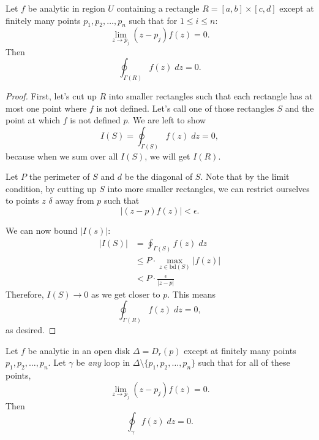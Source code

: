 \documentclass[notes]{subfile}
\begin{document}
\begin{theorem} 
    Let $f$ be analytic in region $U$ containing a rectangle
    $R = [a,b] \times [c,d]$ except at finitely many points
    $p_1, p_2, \ldots, p_n$ such that for $1 \le i \le n$:
    \[ \lim_{z \to p_j} (z-p_j) f(z) = 0.\]
    Then
    \[ \oint_{\Gamma(R)} f(z) \; dz = 0. \]
\end{theorem}

\begin{proof}
    First, let's cut up $R$ into smaller rectangles such
    that each rectangle has at most one point
    where $f$ is not defined.
    Let's call one of those rectangles $S$ and the point
    at which $f$ is not defined $p$.
    We are left to show
    \[ I(S) = \oint_{\Gamma(S)} f(z) \; dz = 0, \]
    because when we sum over all $I(S)$, we will get $I(R)$.

    \noindent
    Let $P$ the perimeter of $S$ and $d$ be the diagonal
    of $S$.
    Note that by the limit condition, by cutting 
    up $S$ into more smaller rectangles, 
    we can restrict ourselves to points $z$ $\delta$
    away from $p$ such that
    \[ |(z-p)f(z)| < \epsilon. \tag{1} \]

    We can now bound $|I(s)|$:
    \begin{align*}
        |I(S)| &= \oint_{\Gamma(S)} f(z) \; dz \\
        &\le P \cdot \max_{z \in \text{bd}(S)} |f(z)| 
        \tag{ML Theorem}\\
        &< P \cdot \frac{\epsilon}{|z-p|} 
    \end{align*}
    Therefore, $I(S) \to 0$ as we get closer to $p$.
    This means
    \[ \oint_{\Gamma(R)} f(z) \; dz = 0, \]
    as desired.
\end{proof}

\begin{theorem}
    Let $f$ be analytic in an open disk $\Delta = D_r(p)$
    except at finitely many points $p_1, p_2, \ldots, p_n$.
    Let $\gamma$ be \textit{any} loop in $\Delta \setminus 
    \{ p_1, p_2, \ldots, p_n \}$ such that for all of these points,
    \[ \lim_{z \to p_j} (z-p_j)f(z) = 0.\]
    Then
    \[ \oint_{\gamma} f(z) \; dz = 0. \]
\end{theorem}
\end{document}
